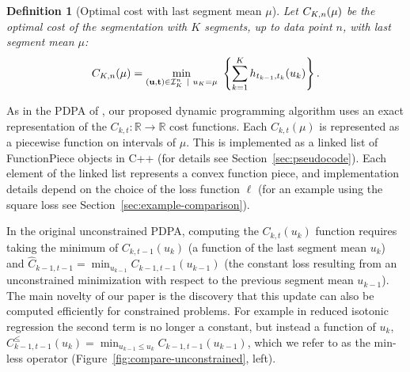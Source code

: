 \documentclass{article}
\newtheorem{definition}{Definition}
\newcommand{\RR}{\mathbb R}
\begin{document}


\begin{definition}[Optimal cost with last segment mean $\mu$]
\label{def:fcc}
  Let $C_{K,n}(\mu)$ be the optimal cost of the segmentation
  with $K$ segments, up to data point $n$, with last segment mean
  $\mu$:
\begin{equation}
C_{K,n}(\mu) = \min_{(\mathbf u, \mathbf t)\in{\mathcal I}^n_K \ | \ u_K = \mu} \
  \left\{ \sum_{k=1}^K
  h_{t_{k-1}, t_k}(u_k) \right\}.
\end{equation}
\end{definition}

As in the PDPA of \citet{pruned-dp}, our proposed dynamic programming
algorithm uses an exact representation of the
$C_{k,t}:\RR\rightarrow\RR$ cost functions. Each $C_{k,t}(\mu)$ is
represented as a piecewise function on intervals of $\mu$. This is
implemented as a linked list of FunctionPiece objects in C++ (for
details see Section~\ref{sec:pseudocode}). Each element of the linked list
represents a convex function piece, and implementation details depend
on the choice of the loss function $\ell$ (for an example using the
square loss see Section~\ref{sec:example-comparison}).

In the original unconstrained PDPA, computing the $C_{k,t}(u_k)$
function requires taking the minimum of $C_{k,t-1}(u_k)$ (a function
of the last segment mean $u_k$) and
$\hat C_{k-1,t-1} = \min_{u_{k-1}} C_{k-1,t-1}(u_{k-1})$ (the constant
loss resulting from an unconstrained minimization with respect to the
previous segment mean $u_{k-1}$). The main novelty of our paper is the
discovery that this update can also be computed efficiently for
constrained problems. For example in reduced isotonic regression the second
term is no longer a constant, but instead a function of $u_k$,
$C_{k-1,t-1}^{\leq}(u_k) = \min_{u_{k-1}\leq u_k}
C_{k-1,t-1}(u_{k-1})$, which we refer to as the min-less operator
(Figure~\ref{fig:compare-unconstrained}, left).
\end{document}
